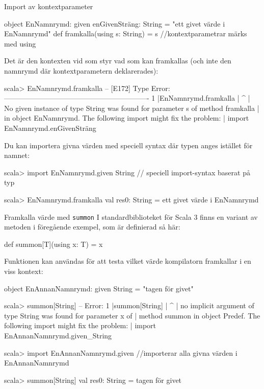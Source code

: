 \begin{Slide}{Import av kontextparameter}\SlideFontTiny
\begin{Code}
object EnNamnrymd:
  given enGivenSträng: String = "ett givet värde i EnNamnrymd"
  def framkalla(using s: String) = s     //kontextparametrar märks med using
\end{Code}
Det är den  kontexten vid  som styr vad som kan framkallas (och inte den namnrymd där kontextparametern deklarerades):
\begin{REPLsmall}
scala> EnNamnrymd.framkalla
-- [E172] Type Error: -------------------------------------------------------------
1 |EnNamnrymd.framkalla
  |                    ^
  | No given instance of type String was found for parameter s of method framkalla 
  | in object EnNamnrymd. The following import might fix the problem:
  | import EnNamnrymd.enGivenSträng
\end{REPLsmall}
Du kan importera givna värden med speciell syntax där typen anges istället för namnet:
\begin{REPLsmall}
scala> import EnNamnrymd.given String    // speciell import-syntax baserat på typ

scala> EnNamnrymd.framkalla
val res0: String = ett givet värde i EnNamnrymd
\end{REPLsmall}
\end{Slide}

\begin{Slide}{Framkalla värde med \texttt{summon}}\SlideFontSmall
I standardbiblioteket för Scala 3 finns en  variant av metoden  i föregående exempel, som är definierad så här:
\begin{Code}
def summon[T](using x: T) = x 
\end{Code}
Funktionen  kan användas för att testa vilket värde kompilatorn framkallar i en viss kontext:
\begin{Code}
object EnAnnanNamnrymd:
  given String = "tagen för givet"
\end{Code}
\ifkompendium\else
\vspace{-0.8em}
\fi
\begin{REPLsmall}
scala> summon[String]
-- Error:
1 |summon[String]
  |              ^
  | no implicit argument of type String was found for parameter x of 
  | method summon in object Predef. The following import might fix the problem:
  | import EnAnnanNamnrymd.given_String

scala> import EnAnnanNamnrymd.given    //importerar alla givna värden i EnAnnanNamnrymd

scala> summon[String]
val res0: String = tagen för givet
\end{REPLsmall}
\end{Slide}

